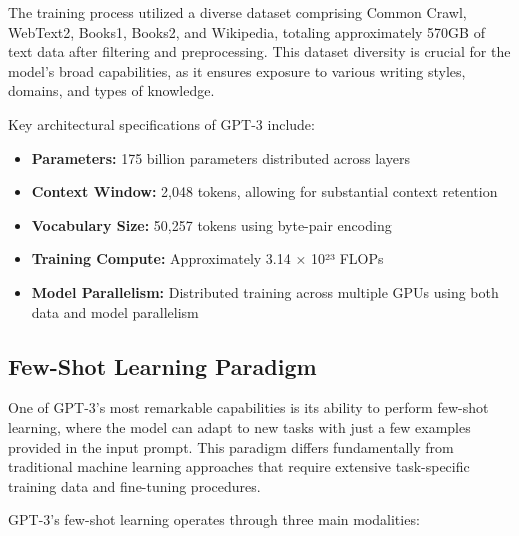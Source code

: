 
The training process utilized a diverse dataset comprising Common Crawl, WebText2, Books1, Books2, and Wikipedia, totaling approximately 570GB of text data after filtering and preprocessing. This dataset diversity is crucial for the model's broad capabilities, as it ensures exposure to various writing styles, domains, and types of knowledge.

Key architectural specifications of GPT-3 include:
\begin{itemize}
    \item \textbf{Parameters:} 175 billion parameters distributed across layers
    \item \textbf{Context Window:} 2,048 tokens, allowing for substantial context retention
    \item \textbf{Vocabulary Size:} 50,257 tokens using byte-pair encoding
    \item \textbf{Training Compute:} Approximately 3.14 × 10²³ FLOPs
    \item \textbf{Model Parallelism:} Distributed training across multiple GPUs using both data and model parallelism
\end{itemize}

\subsection{Few-Shot Learning Paradigm}

One of GPT-3's most remarkable capabilities is its ability to perform few-shot learning, where the model can adapt to new tasks with just a few examples provided in the input prompt. This paradigm differs fundamentally from traditional machine learning approaches that require extensive task-specific training data and fine-tuning procedures.


GPT-3's few-shot learning operates through three main modalities:

